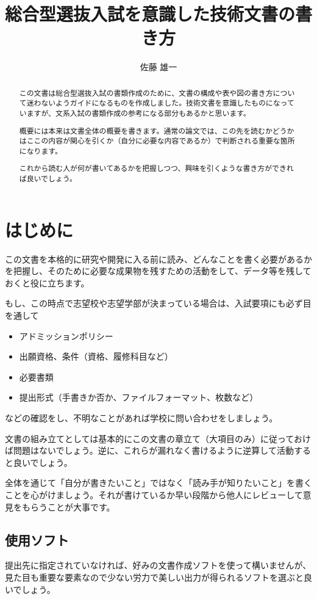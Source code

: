 \documentclass[dvipdfmx, a4paper]{jsarticle}
\title{総合型選抜入試を意識した技術文書の書き方}
\author{佐藤 雄一}
\begin{document}
\maketitle
\begin{abstract}
この文書は総合型選抜入試の書類作成のために、文書の構成や表や図の書き方について迷わないようガイドになるものを作成しました。技術文書を意識したものになっていますが、文系入試の書類作成の参考になる部分もあるかと思います。

概要には本来は文書全体の概要を書きます。通常の論文では、この先を読むかどうかはここの内容が関心を引くか（自分に必要な内容であるか）で判断される重要な箇所になります。

これから読む人が何が書いてあるかを把握しつつ、興味を引くような書き方ができれば良いでしょう。
\end{abstract}

\section{はじめに}
この文書を本格的に研究や開発に入る前に読み、どんなことを書く必要があるかを把握し、そのために必要な成果物を残すための活動をして、データ等を残しておくと役に立ちます。

もし、この時点で志望校や志望学部が決まっている場合は、入試要項にも必ず目を通して
\begin{itemize}
    \item アドミッションポリシー
    \item 出願資格、条件（資格、履修科目など）
    \item 必要書類
    \item 提出形式（手書きか否か、ファイルフォーマット、枚数など）
\end{itemize}
などの確認をし、不明なことがあれば学校に問い合わせをしましょう。

文書の組み立てとしては基本的にこの文書の章立て（大項目のみ）に従っておけば問題はないでしょう。逆に、これらが漏れなく書けるように逆算して活動すると良いでしょう。

全体を通じて「自分が書きたいこと」ではなく「読み手が知りたいこと」を書くことを心がけましょう。それが書けているか早い段階から他人にレビューして意見をもらうことが大事です。

\subsection{使用ソフト}
提出先に指定されていなければ、好みの文書作成ソフトを使って構いませんが、見た目も重要な要素なので少ない労力で美しい出力が得られるソフトを選ぶと良いでしょう。
\end{document}
